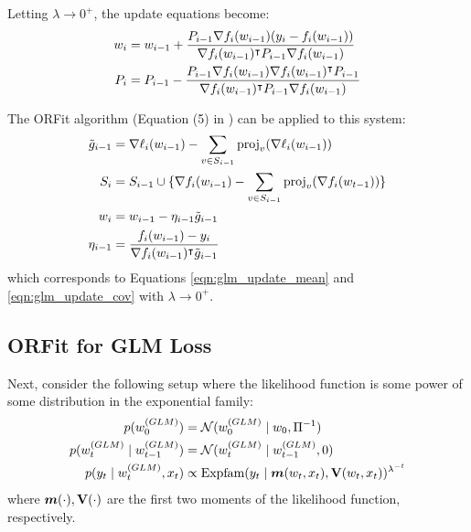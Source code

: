 Letting $\lambda \rightarrow 0^{+}$, the update equations become:
\begin{align}
    w_{i} &= w_{i-1} + 
    \frac{P_{i-1} \nabla f_i(w_{i-1}) (y_i - f_i(w_{i-1}))}{\nabla f_i(w_{i-1})^{\intercal} P_{i-1} \nabla f_i(w_{i-1})} \label{eqn:ekf_mean} \\
    P_{i} &= P_{i-1} - 
    \frac{P_{i-1} \nabla f_i(w_{i-1}) \nabla f_i(w_{i-1})^{\intercal} P_{i-1}}{\nabla f_i(w_{i-1})^{\intercal} P_{i-1} \nabla f_i(w_{i-1})} \label{eqn:ekf_cov}
\end{align}

The ORFit algorithm (Equation (5) in \cite{ORFit}) can be applied to this system:
\begin{align}
    \tilde{g}_{i-1} &= \nabla \ell_{i}(w_{i-1}) - \sum_{v \in S_{i-1}} \mathrm{proj}_{v}(\nabla \ell_i (w_{i-1})) \\
    S_i &= S_{i-1} \cup \{ \nabla f_i(w_{i-1}) - \sum_{v \in S_{i-1}} \mathrm{proj}_{v}(\nabla f_i(w_{t-1})) \} \\
    w_i &= w_{i-1} - \eta_{i-1} \tilde{g}_{i-1} \label{eqn:orfit_update} \\
    \eta_{i-1} &= \frac{f_i(w_{i-1}) - y_i}{\nabla f_i(w_{i-1})^{\intercal} \tilde{g}_{i-1}} \label{eqn:orfit_lr}
\end{align}
which corresponds to Equations \ref{eqn:glm_update_mean} and \ref{eqn:glm_update_cov} with $\lambda \rightarrow 0^{+}$.


\subsection{ORFit for GLM Loss}
\label{sec:orfit_nonlinear}
Next, consider the following setup where the likelihood function is some power of some
distribution in the exponential family:
\begin{align}
    p(w_0^{(GLM)}) &= \mathcal{N}(w_0^{(GLM)} \mid w_0, \Pi^{-1}) \\
    p(w_t^{(GLM)} \mid w_{t-1}^{(GLM)}) &= \mathcal{N}(w_t^{(GLM)} \mid w_{t-1}^{(GLM)}, 0) \\
    p(y_t \mid w_t^{(GLM)}, x_t) &\propto \mathrm{Expfam}(y_t \mid {\bm{m}}(w_t, x_t), \mathbf{V}(w_t, x_t))^{\lambda^{-t}}
\end{align}
where ${\bm{m}}(\cdot), \mathbf{V}(\cdot)$ are the first two moments of the likelihood function,
respectively.

